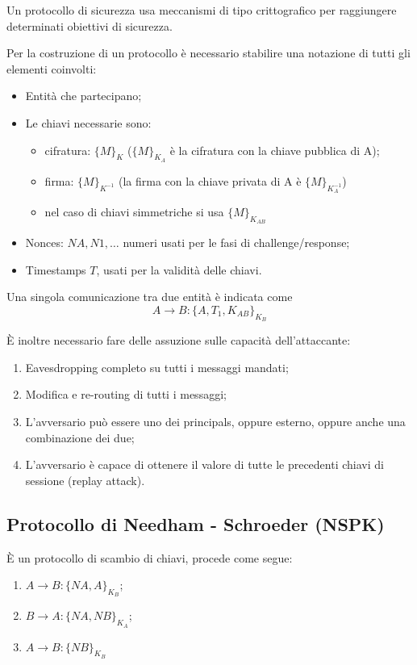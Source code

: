 \documentclass[a4paper, 10pt, twoside]{article}
\begin{document}
	Un protocollo di sicurezza usa meccanismi di tipo crittografico per raggiungere determinati obiettivi di sicurezza.
	
	Per la costruzione di un protocollo è necessario stabilire una notazione di tutti gli elementi coinvolti:
	\begin{itemize}
		\item Entità che partecipano;
		\item Le chiavi necessarie sono:
			\begin{itemize}
				\item cifratura: $\lbrace M\rbrace_K$ ($\lbrace M\rbrace_{K_A}$ è la cifratura con la chiave pubblica di A);
				\item firma: $\lbrace M\rbrace_{K^{-1}}$ (la firma con la chiave privata di A è $\lbrace M\rbrace_{K_A^{-1}}$)
				\item nel caso di chiavi simmetriche si usa $\lbrace M\rbrace_{K_{AB}}$
			\end{itemize}
		\item Nonces: $NA, N1, \dots$ numeri usati per le fasi di challenge/response;
		\item Timestamps $T$, usati per la validità delle chiavi.
	\end{itemize}

	Una singola comunicazione tra due entità è indicata come \[ A \to B : \lbrace A, T_1, K_{AB}\rbrace_{K_B} \]

	È inoltre necessario fare delle assuzione sulle capacità dell'attaccante:
	\begin{enumerate}
		\item Eavesdropping completo su tutti i messaggi mandati;
		\item Modifica e re-routing di tutti i messaggi;
		\item L'avversario può essere uno dei principals, oppure esterno, oppure anche una combinazione dei due;
		\item L'avversario è capace di ottenere il valore di tutte le precedenti chiavi di sessione (replay attack).
	\end{enumerate}

	\subsection{Protocollo di Needham - Schroeder (NSPK)}
	È un protocollo di scambio di chiavi, procede come segue:
	\begin{enumerate}
		\item $A \to B: \lbrace NA, A\rbrace_{K_B}$;
		\item $B \to A: \lbrace NA, NB\rbrace_{K_A}$;
		\item $A \to B: \lbrace NB\rbrace_{K_B}$
	\end{enumerate}
\end{document}
